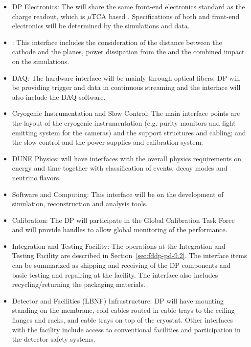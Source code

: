 \begin{itemize}

\item DP Electronics: The  will share the same front-end electronics standard as the charge readout, which is $\mu$TCA based \cite{utca}. Specifications of both  and front-end electronics will be determined by the simulations and  data.

\item {}: This interface includes the consideration of the distance between the cathode and the  planes, power dissipation from the  and the combined impact on the simulations.

\item DAQ: The hardware interface will be mainly through optical fibers. DP  will be providing trigger and data in continuous streaming and the interface will also include the DAQ software.

\item Cryogenic Instrumentation and Slow Control: The main interface points are the layout of the cryogenic instrumentation (e.g. purity monitors and light emitting system for the cameras) and the  support structures and cabling; and the slow control and the  power supplies and calibration system.

\item DUNE Physics: \dual {} will have interfaces with the overall physics requirements on energy and time together with classification of events, decay modes and neutrino flavors.

\item Software and Computing: This interface will be on the development of simulation, reconstruction and analysis tools.

\item Calibration: The DP  will participate in the Global Calibration Task Force and will provide handles to allow global monitoring of the  performance.

\item Integration and Testing Facility: The operations at the Integration and Testing Facility are described in Section~\ref{sec:fddp-pd-9.2}. The interface items can be summarized as shipping and receiving of the DP  components and basic testing and repairing at the facility. The interface also includes recycling/returning the packaging materials.

\item Detector and Facilities (LBNF) Infrastructure: DP  will have  mounting standing on the membrane, cold cables routed in cable trays to the ceiling \fdth flanges and racks, and cable trays on top of the cryostat. Other interfaces with the facility include access to conventional facilities and participation in the detector safety systems. 


\end{itemize}
